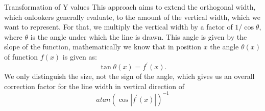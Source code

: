\documentclass[11pt]{article}\usepackage{graphicx, color}
\begin{document}
\begin{subsection}{Transformation of Y values}
This approach aims to extend the orthogonal width, which onlookers generally evaluate,  to the amount of the vertical width, which we want to represent. 
For that, we multiply the vertical width by a factor of $1/\cos\theta$, where $\theta$ is the angle under which the line is drawn. This angle is given by the slope of the function, mathematically we know that in position $x$ the angle $\theta(x)$ of function $f(x)$ is given as:
\[
\tan \theta (x) = f^\prime (x).
\]
We only distinguish the size, not the sign of the angle, which gives us an overall correction factor for the line width in vertical direction of 
\begin{equation}\label{correction1}
atan \left(\cos \left| f^\prime (x) \right|\right) ^{-1}
\end{equation}







\begin{figure}[htbp]\centering




\end{figure}
\end{subsection}
\end{document}
